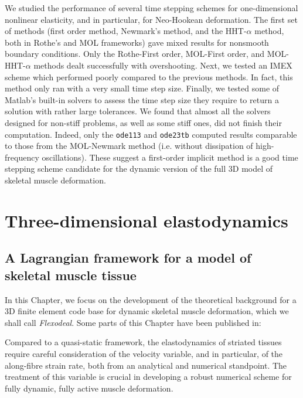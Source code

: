 \documentclass{sfuthesis}
\numberwithin{equation}{section}
\numberwithin{figure}{chapter}
\numberwithin{table}{chapter}
\theoremstyle{definition}
\begin{document}
We studied the performance of several time stepping schemes for one-dimensional nonlinear elasticity, and in particular, for Neo-Hookean deformation. The first set of methods (first order method, Newmark's method, and the HHT-$\alpha$ method, both in Rothe's and MOL frameworks) gave mixed results for nonsmooth boundary conditions. Only the Rothe-First order, MOL-First order, and MOL-HHT-$\alpha$ methods dealt successfully with overshooting. Next, we tested an IMEX scheme which performed poorly compared to the previous methods. In fact, this method only ran with a very small time step size. Finally, we tested some of Matlab's built-in solvers to assess the time step size they require to return a solution with rather large tolerances. We found that almost all the solvers designed for non-stiff problems, as well as some stiff ones, did not finish their computation. Indeed, only the \texttt{ode113} and \texttt{ode23tb} computed results comparable to those from the MOL-Newmark method (i.e. without dissipation of high-frequency oscillations).
These suggest a first-order implicit method is a good time stepping scheme candidate for the dynamic version of the full 3D model of skeletal muscle deformation.

\part{Three-dimensional elastodynamics}

\chapter{A Lagrangian framework for a model of skeletal muscle tissue} \label{ch:lagrangian_formulation}

In this Chapter, we focus on the development of the theoretical background for a 3D finite element code base for dynamic skeletal muscle deformation, which we shall call \textit{Flexodeal}. Some parts of this Chapter have been published in:

\medskip
\noindent {}
\medskip

Compared to a quasi-static framework, the elastodynamics of striated tissues require careful consideration of the velocity variable, and in particular, of the along-fibre strain rate, both from an analytical and numerical standpoint. The treatment of this variable is crucial in developing a robust numerical scheme for fully dynamic, fully active muscle deformation.
\end{document}
